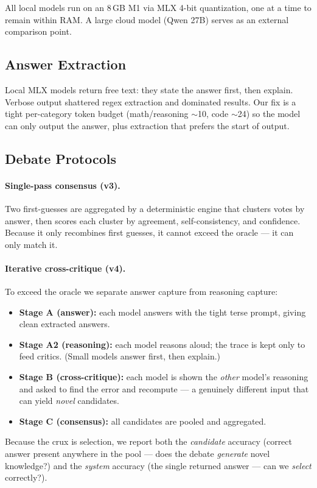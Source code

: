 \documentclass[10pt,twocolumn]{article}
\begin{document}
All local models run on an 8\,GB M1 via MLX 4-bit quantization, one at a time
to remain within RAM. A large cloud model (Qwen 27B) serves as an external
comparison point.

\subsection{Answer Extraction}
Local MLX models return free text: they state the answer first, then explain.
Verbose output shattered regex extraction and dominated results. Our fix is a
tight per-category token budget (math/reasoning $\sim$10, code $\sim$24) so the
model can only output the answer, plus extraction that prefers the start of
output.

\subsection{Debate Protocols}
\paragraph{Single-pass consensus (v3).} Two first-guesses are aggregated by a
deterministic engine \cite{consensus} that clusters votes by answer, then scores
each cluster by agreement, self-consistency, and confidence. Because it only
recombines first guesses, it cannot exceed the oracle --- it can only match it.

\paragraph{Iterative cross-critique (v4).} To exceed the oracle we separate
answer capture from reasoning capture:
\begin{itemize}
  \item \textbf{Stage A (answer):} each model answers with the tight terse
        prompt, giving clean extracted answers.
  \item \textbf{Stage A2 (reasoning):} each model reasons aloud; the trace is
        kept only to feed critics. (Small models answer first, then explain.)
  \item \textbf{Stage B (cross-critique):} each model is shown the \emph{other}
        model's reasoning and asked to find the error and recompute --- a
        genuinely different input that can yield \emph{novel} candidates.
  \item \textbf{Stage C (consensus):} all candidates are pooled and aggregated.
\end{itemize}
Because the crux is selection, we report both the \emph{candidate} accuracy
(correct answer present anywhere in the pool --- does the debate
\emph{generate} novel knowledge?) and the \emph{system} accuracy (the single
returned answer --- can we \emph{select} correctly?).
\end{document}
